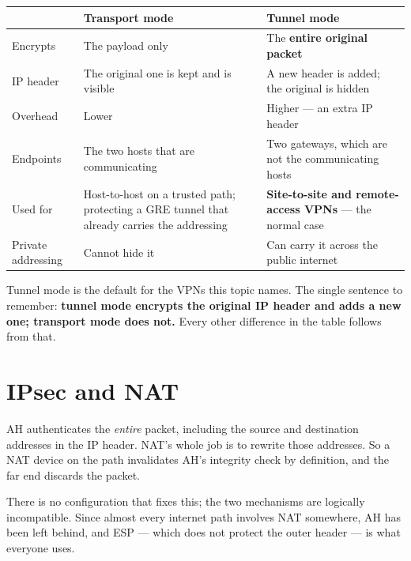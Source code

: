 \begin{longtable}{@{}L{3.0cm}L{5.9cm}L{6.0cm}@{}}
\toprule
{}
\textbf{} & \textbf{Transport mode} & \textbf{Tunnel mode} \\
\midrule
\endhead
Encrypts & The payload only & The \textbf{entire original packet} \\
IP header & The original one is kept and is visible &
A new header is added; the original is hidden \\
Overhead & Lower & Higher --- an extra IP header \\
Endpoints & The two hosts that are communicating &
Two gateways, which are not the communicating hosts \\
Used for & Host-to-host on a trusted path; protecting a GRE tunnel that already
carries the addressing &
\textbf{Site-to-site and remote-access VPNs} --- the normal case \\
Private addressing & Cannot hide it & Can carry it across the public internet \\
\bottomrule
\end{longtable}

\begin{examnote}
Tunnel mode is the default for the VPNs this topic names. The single sentence to
remember: \textbf{tunnel mode encrypts the original IP header and adds a new one;
transport mode does not.} Every other difference in the table follows from that.
\end{examnote}

\section{IPsec and NAT}

\begin{alertbox}
AH authenticates the \emph{entire} packet, including the source and destination
addresses in the IP header. NAT's whole job is to rewrite those addresses. So a
NAT device on the path invalidates AH's integrity check by definition, and the
far end discards the packet.

There is no configuration that fixes this; the two mechanisms are logically
incompatible. Since almost every internet path involves NAT somewhere, AH has
been left behind, and ESP --- which does not protect the outer header --- is what
everyone uses.
\end{alertbox}

